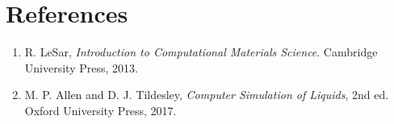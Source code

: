 
\newpage
\section*{References}

\begin{enumerate}
    \item R. LeSar, \textit{Introduction to Computational Materials Science}. Cambridge University Press, 2013.
    \item M. P. Allen and D. J. Tildesley, \textit{Computer Simulation of     Liquids}, 2nd ed. Oxford University Press, 2017.
\end{enumerate}
